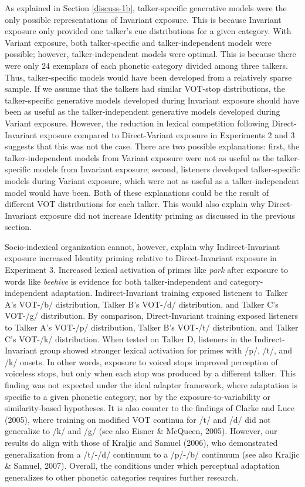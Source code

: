 \documentclass[
  12pt,
  twoside]{article}
\begin{document}
As explained in Section \ref{discuss-1b}, talker-specific generative models were the only possible representations of Invariant exposure.
This is because Invariant exposure only provided one talker's cue distributions for a given category.
With Variant exposure, both talker-specific and talker-independent models were possible; however, talker-independent models were optimal.
This is because there were only 24 exemplars of each phonetic category divided among three talkers.
Thus, talker-specific models would have been developed from a relatively sparse sample.
If we assume that the talkers had similar VOT-stop distributions, the talker-specific generative models developed during Invariant exposure should have been as useful as the talker-independent generative models developed during Variant exposure.
However, the reduction in lexical competition following Direct-Invariant exposure compared to Direct-Variant exposure in Experiments 2 and 3 suggests that this was not the case.
There are two possible explanations: first, the talker-independent models from Variant exposure were not as useful as the talker-specific models from Invariant exposure; second, listeners developed talker-specific models during Variant exposure, which were not as useful as a talker-independent model would have been.
Both of these explanations could be the result of different VOT distributions for each talker.
This would also explain why Direct-Invariant exposure did not increase Identity priming as discussed in the previous section.

Socio-indexical organization cannot, however, explain why Indirect-Invariant exposure increased Identity priming relative to Direct-Invariant exposure in Experiment 3.
Increased lexical activation of primes like \emph{park} after exposure to words like \emph{beehive} is evidence for both talker-independent and category-independent adaptation.
Indirect-Invariant training exposed listeners to Talker A's VOT-/b/ distribution, Talker B's VOT-/d/ distribution, and Talker C's VOT-/g/ distribution.
By comparison, Direct-Invariant training exposed listeners to Talker A's VOT-/p/ distribution, Talker B's VOT-/t/ distribution, and Talker C's VOT-/k/ distribution.
When tested on Talker D, listeners in the Indirect-Invariant group showed stronger lexical activation for primes with /p/, /t/, and /k/ onsets.
In other words, exposure to voiced stops improved perception of voiceless stops, but only when each stop was produced by a different talker.
This finding was not expected under the ideal adapter framework, where adaptation is specific to a given phonetic category, nor by the exposure-to-variability or similarity-based hypotheses.
It is also counter to the findings of Clarke and Luce (2005), where training on modified VOT continua for /t/ and /d/ did not generalize to /k/ and /g/ (see also Eisner \& McQueen, 2005).
However, our results do align with those of Kraljic and Samuel (2006), who demonstrated generalization from a /t/-/d/ continuum to a /p/-/b/ continuum (see also Kraljic \& Samuel, 2007).
Overall, the conditions under which perceptual adaptation generalizes to other phonetic categories requires further research.
\end{document}
